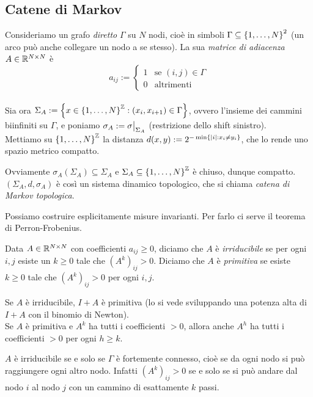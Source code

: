 \subsection{Catene di Markov}

Consideriamo un grafo \emph{diretto} $\Gamma$ su $N$ nodi, cioè in simboli $\Gamma\subseteq\left\{1,\dots,N\right\}^2$
(un arco può anche collegare un nodo a se stesso). La sua \emph{matrice di adiacenza} $A\in\mathbb{R}^{N\times N}$ è
\[ a_{ij}:=\begin{cases}1 & \text{se }(i,j)\in\Gamma \\ 0 & \text{altrimenti}\end{cases} \] \\
Sia ora $\Sigma_A:=\left\{x\in\left\{1,\dots,N\right\}^{\mathbb{Z}}:(x_i,x_{i+1})\in\Gamma\right\}$, ovvero l'insieme dei cammini biinfiniti
su $\Gamma$, e poniamo $\sigma_A:=\restr{\sigma}{\Sigma_A}$ (restrizione dello shift sinistro). \\
Mettiamo su $\left\{1,\dots,N\right\}^{\mathbb{Z}}$ la distanza $d(x,y):=2^{-\min\left\{\left|i\right|:x_i\neq y_i\right\}}$, che lo rende
uno spazio metrico compatto.

\begin{oss}Ovviamente $\sigma_A(\Sigma_A)\subseteq \Sigma_A$ e $\Sigma_A\subseteq\left\{1,\dots,N\right\}^{\mathbb{Z}}$ è chiuso,
dunque compatto. $(\Sigma_A,d,\sigma_A)$ è così un sistema dinamico topologico, che si chiama \emph{catena di Markov topologica}.
\end{oss}

Possiamo costruire esplicitamente misure invarianti. Per farlo ci serve il teorema di Perron-Frobenius.

\begin{defi}Data $A\in\mathbb{R}^{N\times N}$ con coefficienti $a_{ij}\ge 0$, diciamo che $A$ è \emph{irriducibile}
se per ogni $i,j$ esiste un $k\ge 0$ tale che $(A^k)_{ij}>0$. Diciamo che $A$ è \emph{primitiva} se
esiste $k\ge 0$ tale che $(A^k)_{ij}>0$ per ogni $i,j$.
\end{defi}

\begin{oss}Se $A$ è irriducibile, $I+A$ è primitiva (lo si vede sviluppando una potenza alta di $I+A$ con il binomio di Newton). \\
Se $A$ è primitiva e $A^k$ ha tutti i coefficienti $>0$, allora anche $A^h$ ha tutti i coefficienti $>0$ per ogni $h\ge k$.
\end{oss}

\begin{oss}$A$ è irriducibile se e solo se $\Gamma$ è fortemente connesso, cioè se da ogni nodo si può raggiungere ogni altro nodo.
Infatti $(A^k)_{ij}>0$ se e solo se si può andare dal nodo $i$ al nodo $j$ con un cammino di esattamente $k$ passi.
\end{oss}

